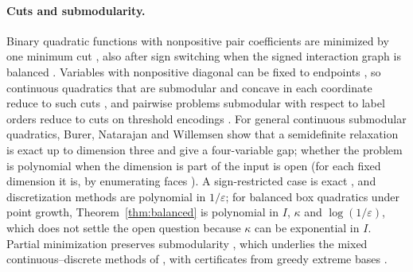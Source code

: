 \paragraph{Cuts and submodularity.}
Binary quadratic functions with nonpositive pair coefficients are minimized by
one minimum cut \cite{Ivanescu1965,PicardRatliff1975,BorosHammer2002,
KolmogorovZabih2004}, also after sign switching when the signed interaction
graph is balanced \cite{Harary1953,HammerHansenSimeone1984,Padberg1989}.
Variables with nonpositive diagonal can be fixed to endpoints
\cite{Rosenberg1972,DelPiaKhajavirad2026,Khajavirad2026PolyBox}, so continuous
quadratics that are submodular and concave in each coordinate reduce to such
cuts \cite{BurerNatarajanWillemsen2026v3}, and pairwise problems submodular
with respect to label orders reduce to cuts on threshold encodings
\cite{SchlesingerFlach2006,Ishikawa2003,Hochbaum2001}. For general continuous
submodular quadratics, Burer, Natarajan and Willemsen show that a
semidefinite relaxation is exact up to dimension three and give a
four-variable gap; whether the problem is polynomial when the dimension is
part of the input is open \cite[footnote~2]{BurerNatarajanWillemsen2026v3}
(for each fixed dimension it is, by enumerating faces \cite{Vavasis1990}). A
sign-restricted case is exact \cite{KimKojima2003}, and discretization
methods \cite{Bach2019,Bach2018Isotonic,AxelrodLiuSidford2020} are polynomial
in $1/\varepsilon$; for balanced box quadratics under point growth,
Theorem~\ref{thm:balanced} is polynomial in $I$, $\kappa$ and
$\log(1/\varepsilon)$, which does not settle
the open question because $\kappa$ can be exponential in $I$. Partial minimization preserves
submodularity \cite{Topkis1978,Topkis1998}, which underlies the mixed
continuous--discrete methods of \cite{GomezHan2025,BuntonTabuada2022}, with
certificates from greedy extreme bases
\cite{Edmonds1970,Cunningham1985,IwataFleischerFujishige2001}.


